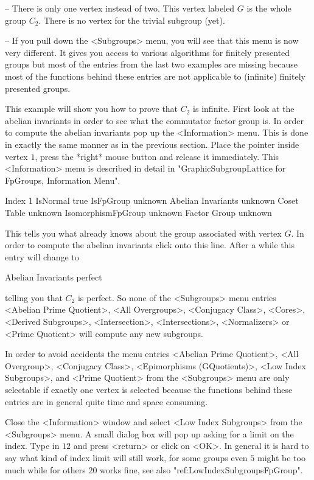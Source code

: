 -- There is only one vertex instead of two.  This vertex labeled $G$ is the
whole group $C_2$.  There is no vertex for the trivial subgroup (yet).

-- If you pull down the <Subgroups> menu, you will see  that this menu is
now   very different.   It gives  you   access to various algorithms  for
finitely presented  groups  but most of  the  entries  from the last  two
examples  are missing because most of  the {\GAP}  functions behind these
entries are not applicable to (infinite) finitely presented groups.

This  example will show  you how to prove that  $C_2$ is infinite.  First
look at the abelian invariants in order to see what the commutator factor
group is.   In  order  to  compute the abelian    invariants pop  up  the
<Information> menu.   This is done in exactly  the same manner  as in the
previous section.  Place the pointer inside vertex $1$, press the *right*
mouse button and release   it  immediately.  This <Information> menu   is
described  in   detail in  "GraphicSubgroupLattice  for FpGroups, Information
Menu".

\begintt
Index              1
IsNormal           true
IsFpGroup          unknown
Abelian Invariants unknown
Coset Table        unknown
IsomorphismFpGroup unknown
Factor Group       unknown 
\endtt

This tells you what {\XGAP} already knows  about the group associated with
vertex $G$.   In order to compute the  abelian invariants click onto this
line.  After a while this entry will change to

\begintt
Abelian Invariants perfect 
\endtt

telling you  that $C_2$  is perfect.   So none   of the  <Subgroups> menu
entries <Abelian  Prime Quotient>,  <All Overgroups>,  <Conjugacy Class>,
<Cores>,  <Derived Subgroups>,  <Intersection>, <Intersections>,
<Normalizers> or  <Prime Quotient> will compute any new subgroups.

In order to avoid accidents the menu entries <Abelian Prime Quotient>,
<All  Overgroup>, <Conjugacy Class>, <Epimorphisms (GQuotients)>, <Low
Index  Subgroups>, and <Prime Quotient>  from the <Subgroups> menu are
only  selectable   if exactly   one vertex   is selected  because  the
functions behind   these entries are in  general  quite time and space
consuming.

Close the <Information> window and select <Low  Index Subgroups> from the
<Subgroups> menu.  A small dialog box will  pop up asking  for a limit on
the index.  Type in $12$ and press <return> or click on <OK>.  In general
it  is hard to say what   kind of index  limit  will still work, for some
groups even $5$ might be too  much while for others  $20$ works fine, see
also "ref:LowIndexSubgroupsFpGroup".

